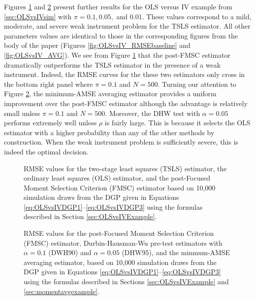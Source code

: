 Figures \ref{fig:OLSvsIV_RMSEbaseline_weak} and \ref{fig:OLSvsIV_AVG_weak} present further results for the OLS versus IV example from \ref{sec:OLSvsIVsim} with $\pi = 0.1, 0.05,$ and $0.01$.
These values correspond to a mild, moderate, and severe weak instrument problem for the TSLS estimator.
All other parameters values are identical to those in the corresponding figures from the body of the paper (Figures \ref{fig:OLSvsIV_RMSEbaseline} and \ref{fig:OLSvsIV_AVG}).
We see from Figure \ref{fig:OLSvsIV_RMSEbaseline_weak} that the post-FMSC estimator dramatically outperforms the TSLS estimator in the presence of a weak instrument.
Indeed, the RMSE curves for the these two estimators only cross in the bottom right panel where $\pi = 0.1$ and $N = 500$. 
Turning our attention to Figure \ref{fig:OLSvsIV_AVG_weak}, the minimum-AMSE averaging estimator provides a uniform improvement over the post-FMSC estimator although the advantage is relatively small unless $\pi = 0.1$ and $N=500$. 
Moreover, the DHW test with $\alpha = 0.05$ performs extremely well unless $\rho$ is fairly large.
This is because it selects the OLS estimator with a higher probability than any of the other methods by construction.
When the weak instrument problem is sufficiently severe, this is indeed the optimal decision.


\begin{figure}[h]
\centering
	
	\caption{RMSE values for the two-stage least squares (TSLS) estimator, the ordinary least squares (OLS) estimator, and the post-Focused Moment Selection Criterion (FMSC) estimator based on 10,000 simulation draws from the DGP given in Equations \ref{eq:OLSvsIVDGP1}--\ref{eq:OLSvsIVDGP3} using the formulas described in Section \ref{sec:OLSvsIVExample}.}
	\label{fig:OLSvsIV_RMSEbaseline_weak}
\end{figure}

\begin{figure}[h]
\centering
	
	\caption{RMSE values for the post-Focused Moment Selection Criterion (FMSC) estimator, Durbin-Hausman-Wu pre-test estimators with $\alpha = 0.1$ (DWH90) and $\alpha = 0.05$ (DHW95), and the minmum-AMSE averaging estimator, based on 10,000 simulation draws from the DGP given in Equations \ref{eq:OLSvsIVDGP1}--\ref{eq:OLSvsIVDGP3} using the formulas described in Sections \ref{sec:OLSvsIVExample} and \ref{sec:momentavgexample}.}
	\label{fig:OLSvsIV_AVG_weak}
\end{figure}


